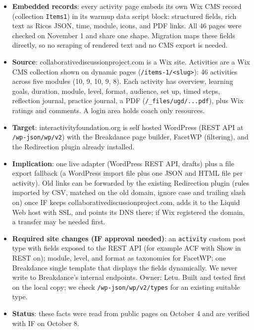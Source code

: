 \begin{itemize}
  \item \textbf{Embedded records}: every activity page embeds its own Wix CMS record (collection \texttt{Items1}) in its warmup data script block: structured fields, rich text as Ricos JSON, time, module, icons, and PDF links. All 46 pages were checked on November 1 and share one shape. Migration maps these fields directly, so no scraping of rendered text and no CMS export is needed.
  \item \textbf{Source}: collaborativediscussionproject.com is a Wix site. Activities are a Wix CMS collection shown on dynamic pages (\texttt{/items-1/<slug>}): 46 activities across five modules (10, 9, 10, 9, 8). Each activity has overview, learning goals, duration, module, level, format, audience, set up, timed steps, reflection journal, practice journal, a PDF (\texttt{/\_files/ugd/...pdf}), plus Wix ratings and comments. A login area holds coach only resources.
  \item \textbf{Target}: interactivityfoundation.org is self hosted WordPress (REST API at \texttt{/wp-json/wp/v2}) with the Breakdance page builder, FacetWP (filtering), and the Redirection plugin already installed.
  \item \textbf{Implication}: one live adapter (WordPress REST API, drafts) plus a file export fallback (a WordPress import file plus one JSON and HTML file per activity). Old links can be forwarded by the existing Redirection plugin (rules imported by CSV, matched on the old domain, ignore case and trailing slash on) once IF keeps collaborativediscussionproject.com, adds it to the Liquid Web host with SSL, and points its DNS there; if Wix registered the domain, a transfer may be needed first.
  \item \textbf{Required site changes (IF approval needed)}: an \texttt{activity} custom post type with fields exposed to the REST API (for example ACF with Show in REST on); module, level, and format as taxonomies for FacetWP; one Breakdance single template that displays the fields dynamically. We never write to Breakdance's internal endpoints. Owner: Letu. Built and tested first on the local copy; we check \texttt{/wp-json/wp/v2/types} for an existing suitable type.
  \item \textbf{Status}: these facts were read from public pages on October 4 and are verified with IF on October 8.
\end{itemize}

